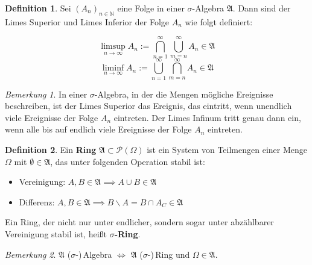 \documentclass[a4paper,10pt,landscape]{article}
\newcommand{\N}{\mathbb{N}}
\theoremstyle{definition}
\newtheorem*{defn}{Definition}
\theoremstyle{remark}
\newtheorem*{bem}{Bemerkung}
\renewcommand{\emph}[1]{\textcolor{Emph}{\bf{#1}}}
\begin{document}
\begin{multicols}{3}
\begin{defn}
  Sei $(A_n)_{n \in \N}$ eine Folge in einer $\sigma$-Algebra $\mathfrak{A}$. Dann sind der Limes Superior und Limes Inferior der Folge $A_n$ wie folgt definiert:

  \[ \limsup_{n \to \infty} A_n := \bigcap_{n = 1}^{\infty} \bigcup_{m = n}^{\infty} A_n \in \mathfrak{A} \]
  \[ \liminf_{n \to \infty} A_n := \bigcup_{n = 1}^{\infty} \bigcap_{m = n}^{\infty} A_n \in \mathfrak{A} \]
\end{defn}

\begin{bem}
  In einer $\sigma$-Algebra, in der die Mengen mögliche Ereignisse beschreiben, ist der Limes Superior das Ereignis, das eintritt, wenn unendlich viele Ereignisse der Folge $A_n$ eintreten. Der Limes Infinum tritt genau dann ein, wenn alle bis auf endlich viele Ereignisse der Folge $A_n$ eintreten.
\end{bem}

\begin{defn}
  Ein \emph{Ring} $\mathfrak{A} \subset \mathcal{P}(\Omega)$ ist ein System von Teilmengen einer Menge $\Omega$ mit $\emptyset \in \mathfrak{A}$, das unter folgenden Operation stabil ist:

  \begin{itemize}
    \item Vereinigung: $A, B \in \mathfrak{A} \implies A \cup B \in \mathfrak{A}$
    \item Differenz: $A, B \in \mathfrak{A} \implies B \backslash A = B \cap A_C \in \mathfrak{A}$
  \end{itemize}

  Ein Ring, der nicht nur unter endlicher, sondern sogar unter abzählbarer Vereinigung stabil ist, heißt \emph{$\sigma$-Ring}.
\end{defn}

\begin{bem}
  $\mathfrak{A}$ ($\sigma$-)\,Algebra $\iff$ $\mathfrak{A}$ ($\sigma$-)\,Ring und $\Omega \in \mathfrak{A}$.
\end{bem}

\end{multicols}
\end{document}
